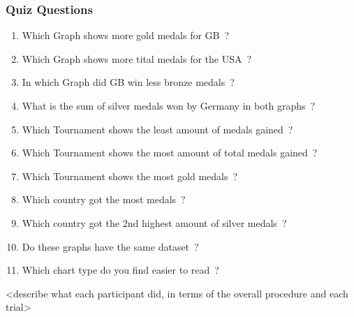 \subsubsection*{Quiz Questions}
\begin{enumerate}
    \setlength{\itemsep}{1pt}
	\setlength{\parskip}{0pt}
	\setlength{\parsep}{0pt}
    \item Which Graph shows more gold medals for GB~?
    \item Which Graph shows more tital medals for the USA~?
    \item In which Graph did GB win less bronze medals~?
    \item What is the sum of silver medals won by Germany in both graphs~?
    \item Which Tournament shows the least amount of medals gained~?
    \item Which Tournament shows the most amount of total medals gained~?
    \item Which Tournament shows the most gold medals~?
    \item Which country got the most medals~?
    \item Which country got the 2nd highest amount of silver medals~?
    \item Do these graphs have the same dataset~?
    \item Which chart type do you find easier to read~?
\end{enumerate}

<describe what each participant did, in terms of the overall procedure and each trial>
